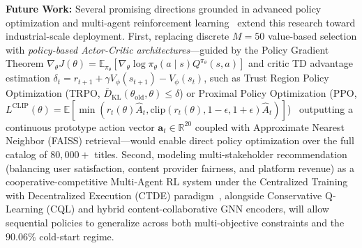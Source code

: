 \textbf{Future Work:} Several promising directions grounded in advanced policy optimization and multi-agent reinforcement learning~\cite{sierra2026rl} extend this research toward industrial-scale deployment. First, replacing discrete $M=50$ value-based selection with \textit{policy-based Actor-Critic architectures}---guided by the Policy Gradient Theorem $\nabla_\theta J(\theta) = \mathbb{E}_{\pi_\theta}[\nabla_\theta \log \pi_\theta(a \mid s) Q^{\pi_\theta}(s, a)]$ and critic TD advantage estimation $\delta_t = r_{t+1} + \gamma V_\phi(s_{t+1}) - V_\phi(s_t)$, such as Trust Region Policy Optimization (TRPO, $\bar{D}_{\text{KL}}(\theta_{\text{old}}, \theta) \le \delta$) or Proximal Policy Optimization (PPO, $L^{\text{CLIP}}(\theta) = \mathbb{E}[\min(r_t(\theta)\hat{A}_t, \text{clip}(r_t(\theta), 1-\epsilon, 1+\epsilon)\hat{A}_t)]$)~\cite{sierra2026rl} outputting a continuous prototype action vector $\mathbf{a}_t \in \mathbb{R}^{20}$ coupled with Approximate Nearest Neighbor (FAISS) retrieval---would enable direct policy optimization over the full catalog of $80,000+$ titles. Second, modeling multi-stakeholder recommendation (balancing user satisfaction, content provider fairness, and platform revenue) as a cooperative-competitive Multi-Agent RL system under the Centralized Training with Decentralized Execution (CTDE) paradigm~\cite{sierra2026rl}, alongside Conservative Q-Learning (CQL) and hybrid content-collaborative GNN encoders, will allow sequential policies to generalize across both multi-objective constraints and the $90.06\%$ cold-start regime.
